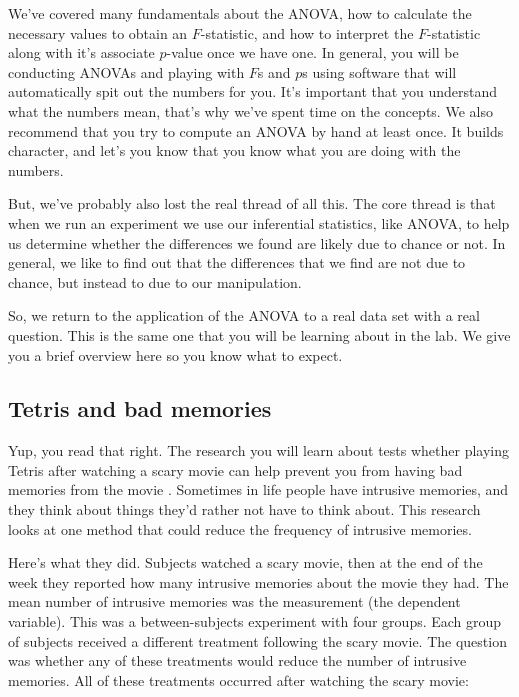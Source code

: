 \documentclass[]{book}
\begin{document}
We've covered many fundamentals about the ANOVA, how to calculate the necessary values to obtain an \(F\)-statistic, and how to interpret the \(F\)-statistic along with it's associate \(p\)-value once we have one. In general, you will be conducting ANOVAs and playing with \(F\)s and \(p\)s using software that will automatically spit out the numbers for you. It's important that you understand what the numbers mean, that's why we've spent time on the concepts. We also recommend that you try to compute an ANOVA by hand at least once. It builds character, and let's you know that you know what you are doing with the numbers.

But, we've probably also lost the real thread of all this. The core thread is that when we run an experiment we use our inferential statistics, like ANOVA, to help us determine whether the differences we found are likely due to chance or not. In general, we like to find out that the differences that we find are not due to chance, but instead to due to our manipulation.

So, we return to the application of the ANOVA to a real data set with a real question. This is the same one that you will be learning about in the lab. We give you a brief overview here so you know what to expect.

\hypertarget{tetris-and-bad-memories}{%
\subsection{Tetris and bad memories}\label{tetris-and-bad-memories}}

Yup, you read that right. The research you will learn about tests whether playing Tetris after watching a scary movie can help prevent you from having bad memories from the movie \citep{james2015computer}. Sometimes in life people have intrusive memories, and they think about things they'd rather not have to think about. This research looks at one method that could reduce the frequency of intrusive memories.

Here's what they did. Subjects watched a scary movie, then at the end of the week they reported how many intrusive memories about the movie they had. The mean number of intrusive memories was the measurement (the dependent variable). This was a between-subjects experiment with four groups. Each group of subjects received a different treatment following the scary movie. The question was whether any of these treatments would reduce the number of intrusive memories. All of these treatments occurred after watching the scary movie:
\end{document}
